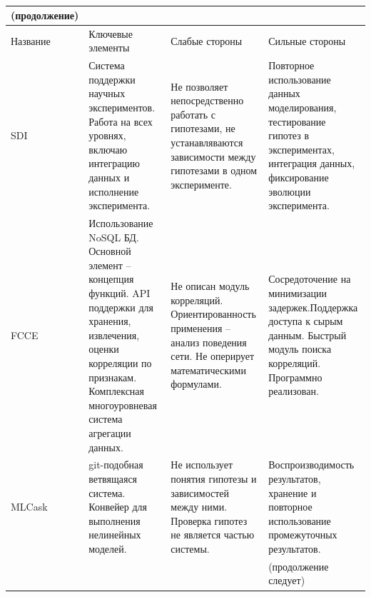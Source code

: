 \begin{table} [ht]%
	\caption*{}%
    \setlength\extrarowheight{0pt} %
    \setlength{\tymin}{2.3cm}%
	\begin{tabulary}{\textwidth}{@{}>{\zz}L >{\zz}L >{\zz}L >{\zz}L@{}}%
        \toprule     %
        \scriptsize (продолжение) & & &
        \\
        \midrule
    	Название &
    	Ключевые элементы &
    	Слабые стороны &
    	Сильные стороны	\\
        \midrule %
        
        SDI &
        Система поддержки научных экспериментов. Работа на всех уровнях, включаю интеграцию данных и исполнение эксперимента. &
        Не позволяет непосредственно работать с гипотезами, не устанавляваются зависимости между гипотезами в одном эксперименте.   &
        Повторное использование данных моделирования, тестирование гипотез в экспериментах, интеграция данных, фиксирование эволюции эксперимента.
        \\
        \midrule
        FCCE &
        Использование NoSQL БД. Основной элемент – концепция функций. API поддержки для хранения, извлечения, оценки корреляции по признакам.
        Комплексная многоуровневая система агрегации данных. 
        &
        Не описан модуль корреляций. Ориентированность применения – анализ поведения сети. Не оперирует математическими формулами. 
        &
        Сосредоточение на минимизации задержек.Поддержка доступа к сырым данным. Быстрый модуль поиска корреляций. Программно реализован.
        \\
        \midrule
        MLCask &
        git-подобная ветвящаяся система. Конвейер для выполнения нелинейных моделей. &
        Не использует понятия гипотезы и зависимостей между ними. Проверка гипотез не является частью системы. &
        Воспроизводимость результатов, хранение и повторное использование промежуточных результатов.
        \\
        \midrule
        & &  & \scriptsize (продолжение следует)
        \\
        \bottomrule %
	\end{tabulary}%
\end{table}

